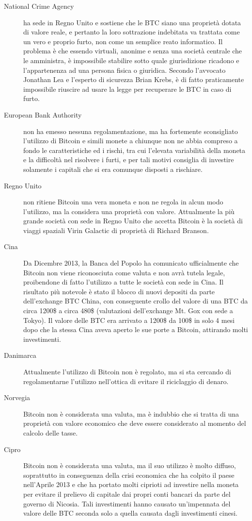 \begin{description}
 \item[National Crime Agency] ha sede in Regno Unito e sostiene che le BTC siano una proprietà dotata di valore reale, e pertanto la loro sottrazione indebitata va trattata come un vero e proprio furto, non come un semplice reato informatico. Il problema è che essendo virtuali, anonime e senza una società centrale che le amministra, è impossibile stabilire sotto quale giurisdizione ricadono e l'appartenenza ad una persona fisica o giuridica. Secondo l'avvocato Jonathan Lea e l'esperto di sicurezza Brian Krebs, è di fatto praticamente impossibile riuscire ad usare la legge per recuperare le BTC in caso di furto.
 \item[European Bank Authority] non ha emesso nessuna regolamentazione, ma ha fortemente sconsigliato l'utilizzo di Bitcoin e simili monete a chiunque non ne abbia compreso a fondo le caratteristiche ed i rischi, tra cui l'elevata variabilità della moneta e la difficoltà nel risolvere i furti, e per tali motivi consiglia di investire solamente i capitali che si era comunque disposti a rischiare.
 \item[Regno Unito] non ritiene Bitcoin una vera moneta e non ne regola in alcun modo l'utilizzo, ma la considera una proprietà con valore. Attualmente la più grande società con sede in Regno Unito che accetta Bitcoin è la società di viaggi spaziali Virin Galactic di proprietà di Richard Branson.
 \item[Cina] Da Dicembre 2013, la Banca del Popolo ha comunicato ufficialmente che Bitcoin non viene riconosciuta come valuta e non avrà tutela legale, proibendone di fatto l'utilizzo a tutte le società con sede in Cina. Il risultato più notevole è stato il blocco di nuovi depositi da parte dell'exchange BTC China, con conseguente crollo del valore di una BTC da circa 1200\$ a circa 480\$ (valutazioni dell'exchange Mt. Gox con sede a Tokyo). Il valore delle BTC era arrivato a 1200\$ da 100\$ in solo 4 mesi dopo che la stessa Cina aveva aperto le sue porte a Bitcoin, attirando molti investimenti.
 \item[Danimarca] Attualmente l'utilizzo di Bitcoin non è regolato, ma si sta cercando di regolamentarne l'utilizzo nell'ottica di evitare il riciclaggio di denaro.
 \item[Norvegia] Bitcoin non è considerata una valuta, ma è indubbio che si tratta di una proprietà con valore economico che deve essere considerato al momento del calcolo delle tasse.
 \item[Cipro] Bitcoin non è considerata una valuta, ma il suo utilizzo è molto diffuso, soprattutto in conseguenza della crisi economica che ha colpito il paese nell'Aprile 2013 e che ha portato molti ciprioti ad investire nella moneta per evitare il prelievo di capitale dai propri conti bancari da parte del governo di Nicosia. Tali investimenti hanno causato un'impennata del valore delle BTC seconda solo a quella causata dagli investimenti cinesi.

\end{description}
